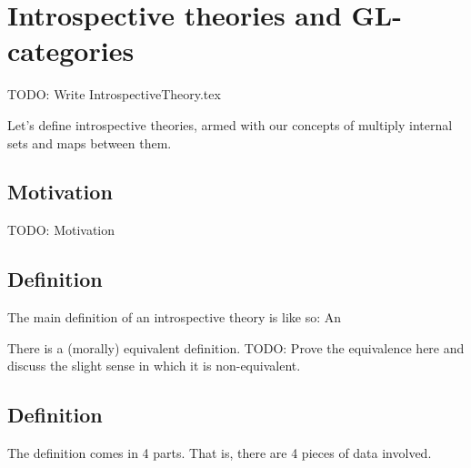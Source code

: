 \section{Introspective theories and GL-categories}
TODO: Write IntrospectiveTheory.tex

Let's define introspective theories, armed with our concepts of multiply internal sets and maps between them.

\subsection{Motivation}
TODO: Motivation

\subsection{Definition}
The main definition of an introspective theory is like so: An 

There is a (morally) equivalent definition. TODO: Prove the equivalence here and discuss the slight sense in which it is non-equivalent.
\subsection{Definition}
The definition comes in 4 parts. That is, there are 4 pieces of data involved.

